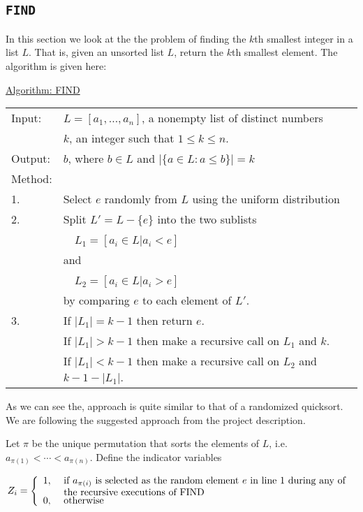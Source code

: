 \documentclass[article,a4paper,oneside]{article}
\newcommand{\+}[1]{\ensuremath{\boldsymbol{#1}}}
\begin{document}
\subsection*{\texttt{FIND}}
In this section we look at the the problem of finding the $k$th smallest integer in a list $L$. That is, given an unsorted list $L$, return the $k$th smallest element.
The algorithm is given here:
\begin{center}\begin{minipage}{5in}
\underline{Algorithm: FIND}\\
\begin{tabular}{ll}
Input: & $L=[a_1,\ldots,a_n]$, a nonempty list of distinct numbers\\
& $k$, an integer such that $1\leq k\leq n$.\\ 
Output: & $b$, where $b\in L$ and $|\{a\in L:a\leq b\}|=k$\\
Method:\\
{\hfill}1. & Select $e$ randomly from $L$ using the uniform distribution\\
{\hfill}2. & Split $L'=L-\{e\}$ into the two sublists\\
& \ \ $L_1=[a_i\in L|a_i<e]$\\
& and\\
& \ \ $L_2=[a_i\in L|a_i>e]$\\
& by comparing $e$ to each element of $L'$.\\
{\hfill}3. & If $|L_1|=k-1$ then return $e$.\\
& If $|L_1|>k-1$ then make a recursive call on $L_1$ and $k$.\\
& \begin{minipage}{4in}
If $|L_1|<k-1$ then make a recursive call on $L_2$ and $k-1-|L_1|$.
\end{minipage}
\end{tabular}
\end{minipage}\end{center}
As we can see the, approach is quite similar to that of a randomized quicksort.
We are following the suggested approach from the project description.
\par

Let $\pi$ be the unique permutation that sorts the elements of $L$,
i.e. $a_{\pi(1)}<\cdots <a_{\pi(n)}$.  Define the indicator variables

$$Z_{i}=\left\{\begin{array}{ll}
1, & \mbox{
\begin{minipage}[t]{4in}
  if $a_{\pi(i)}$ is selected as the random element $e$ in line 1
  during any of the recursive executions of FIND
\end{minipage}
}
\\
0, & \mbox{ otherwise}
\end{array}\right.$$
\end{document}
